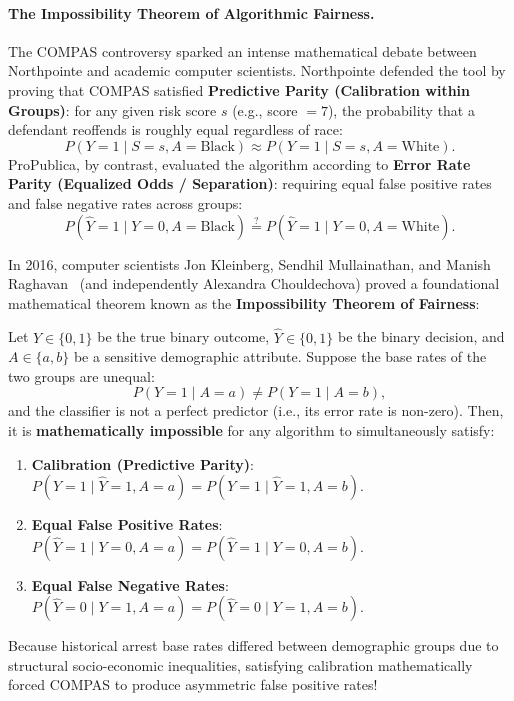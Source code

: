 \paragraph{The Impossibility Theorem of Algorithmic Fairness.}
The COMPAS controversy sparked an intense mathematical debate between Northpointe and academic computer scientists. Northpointe defended the tool by proving that COMPAS satisfied \textbf{Predictive Parity (Calibration within Groups)}: for any given risk score $s$ (e.g., score $= 7$), the probability that a defendant reoffends is roughly equal regardless of race:
\begin{equation}
P(Y = 1 \mid S = s, A = \text{Black}) \approx P(Y = 1 \mid S = s, A = \text{White}).
\label{eq:predictive_parity}
\end{equation}
ProPublica, by contrast, evaluated the algorithm according to \textbf{Error Rate Parity (Equalized Odds / Separation)}: requiring equal false positive rates and false negative rates across groups:
\begin{equation}
P(\hat{Y} = 1 \mid Y = 0, A = \text{Black}) \stackrel{?}{=} P(\hat{Y} = 1 \mid Y = 0, A = \text{White}).
\label{eq:error_rate_parity}
\end{equation}

In 2016, computer scientists Jon Kleinberg, Sendhil Mullainathan, and Manish Raghavan~\cite{kleinberg2016inherent} (and independently Alexandra Chouldechova) proved a foundational mathematical theorem known as the \textbf{Impossibility Theorem of Fairness}:

\begin{theorem}
Let $Y \in \{0, 1\}$ be the true binary outcome, $\hat{Y} \in \{0, 1\}$ be the binary decision, and $A \in \{a, b\}$ be a sensitive demographic attribute. Suppose the base rates of the two groups are unequal:
\begin{equation}
P(Y = 1 \mid A = a) \ne P(Y = 1 \mid A = b),
\end{equation}
and the classifier is not a perfect predictor (i.e., its error rate is non-zero). Then, it is \textbf{mathematically impossible} for any algorithm to simultaneously satisfy:
\begin{enumerate}[noitemsep]
  \item \textbf{Calibration (Predictive Parity)}: $P(Y = 1 \mid \hat{Y} = 1, A = a) = P(Y = 1 \mid \hat{Y} = 1, A = b)$.
  \item \textbf{Equal False Positive Rates}: $P(\hat{Y} = 1 \mid Y = 0, A = a) = P(\hat{Y} = 1 \mid Y = 0, A = b)$.
  \item \textbf{Equal False Negative Rates}: $P(\hat{Y} = 0 \mid Y = 1, A = a) = P(\hat{Y} = 0 \mid Y = 1, A = b)$.
\end{enumerate}
\end{theorem}
Because historical arrest base rates differed between demographic groups due to structural socio-economic inequalities, satisfying calibration mathematically forced COMPAS to produce asymmetric false positive rates! 

